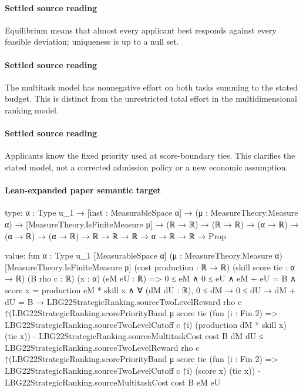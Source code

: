 \documentclass[10pt]{article}
\begin{document}
\paragraph{Settled source reading}
\begin{sloppypar}
Equilibrium means that almost every applicant best responds against every feasible deviation;\allowbreak{} uniqueness is up to a null set.\allowbreak{}
\end{sloppypar}
\paragraph{Settled source reading}
\begin{sloppypar}
The multitask model has nonnegative effort on both tasks summing to the stated budget.\allowbreak{} This is distinct from the unrestricted total effort in the multidimensional ranking model.\allowbreak{}
\end{sloppypar}
\paragraph{Settled source reading}
\begin{sloppypar}
Applicants know the fixed priority used at score-\allowbreak{}boundary ties.\allowbreak{} This clarifies the stated model, not a corrected admission policy or a new economic assumption.\allowbreak{}
\end{sloppypar}

\paragraph{Lean-expanded paper semantic target}
\begin{ReviewVerbatim}
type:
{α : Type u_1} →
  [inst : MeasurableSpace α] →
    (μ : MeasureTheory.Measure α) →
      [MeasureTheory.IsFiniteMeasure μ] → (ℝ → ℝ) → (ℝ → ℝ) → (α → ℝ) → (α → ℝ) → (α → ℝ) → ℝ → ℝ → ℝ → α → ℝ → ℝ → Prop

value:
fun {α : Type u_1} [MeasurableSpace α] (μ : MeasureTheory.Measure α) [MeasureTheory.IsFiniteMeasure μ]
    (cost production : ℝ → ℝ) (skill score tie : α → ℝ) (B rho c : ℝ) (x : α) (eM eU : ℝ) =>
  0 ≤ eM ∧
    0 ≤ eU ∧
      eM + eU = B ∧
        score x = production eM * skill x ∧
          ∀ (dM dU : ℝ),
            0 ≤ dM →
              0 ≤ dU →
                dM + dU = B →
                  LBG22StrategicRanking.sourceTwoLevelReward rho c
                        ↑(LBG22StrategicRanking.scorePriorityBand μ score tie
                            (fun (i : Fin 2) => LBG22StrategicRanking.sourceTwoLevelCutoff c ↑i)
                            (production dM * skill x) (tie x)) -
                      LBG22StrategicRanking.sourceMultitaskCost cost B dM dU ≤
                    LBG22StrategicRanking.sourceTwoLevelReward rho c
                        ↑(LBG22StrategicRanking.scorePriorityBand μ score tie
                            (fun (i : Fin 2) => LBG22StrategicRanking.sourceTwoLevelCutoff c ↑i) (score x) (tie x)) -
                      LBG22StrategicRanking.sourceMultitaskCost cost B eM eU
\end{ReviewVerbatim}
\end{document}
